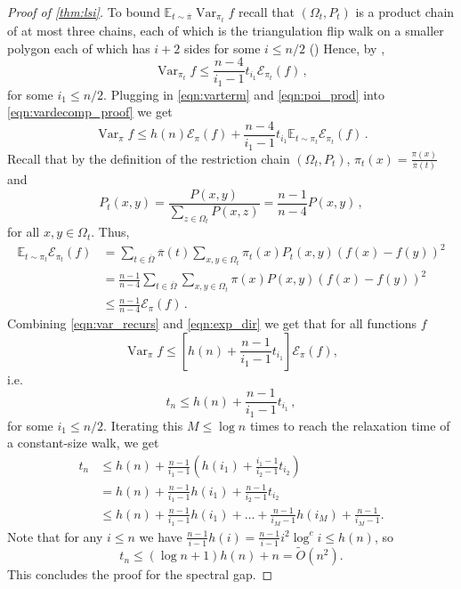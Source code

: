 \documentclass[a4paper, 12p]{article}
\numberwithin{equation}{section}
\newcommand{\Exp}{\mathbb{E}}
\newcommand{\Omproj}{\overline{\Omega}}
\newcommand{\piproj}{\overline{\pi}}
\newcommand{\var}{\operatorname{Var}}
\newcommand{\dir}{\mathcal{E}}
\newcommand{\Om}{\Omega}
\begin{document}
\begin{proof}[Proof of \cref{thm:lsi}]
To bound $\Exp_{t \sim \piproj} \var_{\pi_t} f$ recall that $(\Omega_t, P_t)$ is a product chain of at most three chains, each of which is the triangulation flip walk on a smaller polygon each of which has $i+2$ sides for some $i\leq n/2$ ()
Hence, by ,
\begin{equation}\label{eqn:poi_prod}
\var_{\pi_t}f\leq \frac{n-4}{i_1-1}t_{i_1}\dir_{\pi_t}(f)\,,
\end{equation}
for some $i_1\leq n/2$.
Plugging in \eqref{eqn:varterm} and \eqref{eqn:poi_prod} into \eqref{eqn:vardecomp_proof} we get
\begin{equation}\label{eqn:var_recurs}
    \var_\pi f \leq h(n)\dir_\pi(f)+\frac{n-4}{i_1-1}t_{i_1}\Exp_{t\sim\pi_t}\dir_{\pi_t}(f)\,.
\end{equation}
Recall that by the definition of the restriction chain $(\Omega_t, P_t)$, $\pi_t(x)=\frac{\pi(x)}{\piproj(t)
}$ and
\[P_t(x, y) = \frac{P(x, y)}{\sum_{z \in \Omega_t}P(x, z)}=\frac{n-1}{n-4}P(x,y)\,,\]
for all $x,y\in\Om_t$. Thus,
\begin{align}
    \Exp_{t\sim\pi_t}\dir_{\pi_t}(f)&=\sum_{t\in\Omproj}\piproj(t)\sum_{x,y\in\Om_t}\pi_t(x)P_t(x,y)(f(x)-f(y))^2 \nonumber \\
    &=\frac{n-1}{n-4}\sum_{t\in\Omproj}\sum_{x,y\in\Om_t}\pi(x)P(x,y)(f(x)-f(y))^2 \nonumber \\
    &\leq \frac{n-1}{n-4}\dir_\pi(f)\,.\label{eqn:exp_dir} 
\end{align}
Combining \eqref{eqn:var_recurs} and \eqref{eqn:exp_dir} we get that for all functions $f$
\begin{equation}\label{eqn:var_recurs2}
    \var_\pi f\leq \left[h(n)+ \frac{n-1}{i_1-1}t_{i_1}\right]\dir_\pi(f),
\end{equation}
i.e.
\begin{equation}\label{eqn:rel_recurs}
    t_n\leq h(n)+\frac{n-1}{i_1-1}t_{i_1}\,,
\end{equation}
for some $i_1\leq n/2$. Iterating this $M\leq\log n$ times to reach the relaxation time of a constant-size walk, we get
\begin{align*}
    t_n&\leq h(n)+\frac{n-1}{i_1-1}\left(h(i_1)+\frac{i_1-1}{i_2-1}t_{i_2}\right)\\
    &=h(n)+\frac{n-1}{i_1-1}h(i_1)+\frac{n-1}{i_2-1}t_{i_2}\\
    &\leq h(n)+\frac{n-1}{i_1-1}h(i_1)+\dots+\frac{n-1}{i_M-1}h(i_M)+\frac{n-1}{i_M-1}.
\end{align*}
Note that for any $i\leq n$ we have $\frac{n-1}{i-1}h(i)=\frac{n-1}{i-1}i^{2}\log^ci\leq h(n)$, so
$$t_n\leq (\log n+1)h(n)+n=\widetilde O(n^{2}).$$
This concludes the proof for the spectral gap.


\end{proof}
\end{document}
